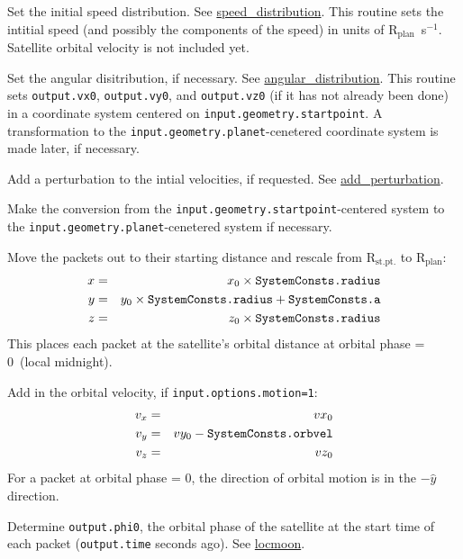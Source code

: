 \documentclass[11pt]{article}
\newcommand\Rplan{R$_{\mathrm{plan}}$}
\begin{document}
\begin{compactenum}
\item Set the initial speed distribution. See
\hyperref[sec:speed_distribution]{speed\_distribution}. This routine sets the
intitial speed (and possibly the components of the speed) in units of \Rplan\
s$^{-1}$. Satellite orbital velocity is not included yet.

\item Set the angular disitribution, if necessary. See
\hyperref[sec:angular_distribution]{angular\_distribution}. This routine sets
\texttt{output.vx0}, \texttt{output.vy0}, and \texttt{output.vz0} (if it has not
already been done) in a coordinate system centered on
\texttt{input.geometry.startpoint}. A transformation to the
\texttt{input.geometry.planet}-cenetered coordinate system is made later, if
necessary.

\item Add a perturbation to the intial velocities, if requested. See 
\hyperref[sec:add_perturbation]{add\_perturbation}.

\item Make the conversion from the \texttt{input.geometry.startpoint}-centered
system to the \texttt{input.geometry.planet}-cenetered system if necessary.
  \begin{compactenum}
  \item Move the packets out to their starting distance and rescale from
  $\mathrm{R_{st.pt.}}$ to \Rplan:
    \begin{eqnarray}
    x & = & x_0 \times \text{\texttt{SystemConsts.radius}} \\
    y & = & y_0 \times \text{\texttt{SystemConsts.radius}} +
      \text{\texttt{SystemConsts.a}} \\
    z & = & z_0 \times \text{\texttt{SystemConsts.radius}}
    \end{eqnarray}
   This places each packet at the satellite's orbital distance at orbital phase
   = 0\degr\ (local midnight).
  \item Add in the orbital velocity, if \texttt{input.options.motion=1}:
    \begin{eqnarray}
    v_x & = & vx_0 \\
    v_y & = & vy_0 - \text{\texttt{SystemConsts.orbvel}} \\
    v_z & = & vz_0
    \end{eqnarray}
    For a packet at orbital phase = 0\degr, the direction of orbital motion is
    in the $-\hat{y}$ direction.
  \item Determine \texttt{output.phi0}, the orbital phase of the satellite at
  the start time of each packet 
  (\texttt{output.time} seconds ago). See \hyperref[sec:locmoon]{locmoon}.


\end{compactenum}
\end{compactenum}
\end{document}
